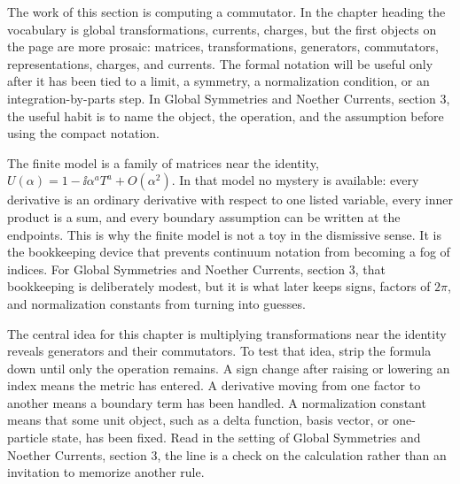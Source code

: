 











The work of this section is computing a commutator.  In the chapter heading the vocabulary is global transformations, currents, charges, but the first objects on the page are more prosaic: matrices, transformations, generators, commutators, representations, charges, and currents.  The formal notation will be useful only after it has been tied to a limit, a symmetry, a normalization condition, or an integration-by-parts step.  In Global Symmetries and Noether Currents, section 3, the useful habit is to name the object, the operation, and the assumption before using the compact notation.

The finite model is a family of matrices near the identity, \(U(\alpha)=1-\ii\alpha^aT^a+O(\alpha^2)\).  In that model no mystery is available: every derivative is an ordinary derivative with respect to one listed variable, every inner product is a sum, and every boundary assumption can be written at the endpoints.  This is why the finite model is not a toy in the dismissive sense.  It is the bookkeeping device that prevents continuum notation from becoming a fog of indices.  For Global Symmetries and Noether Currents, section 3, that bookkeeping is deliberately modest, but it is what later keeps signs, factors of \(2\pi\), and normalization constants from turning into guesses.

The central idea for this chapter is multiplying transformations near the identity reveals generators and their commutators.  To test that idea, strip the formula down until only the operation remains.  A sign change after raising or lowering an index means the metric has entered.  A derivative moving from one factor to another means a boundary term has been handled.  A normalization constant means that some unit object, such as a delta function, basis vector, or one-particle state, has been fixed.  Read in the setting of Global Symmetries and Noether Currents, section 3, the line is a check on the calculation rather than an invitation to memorize another rule.

